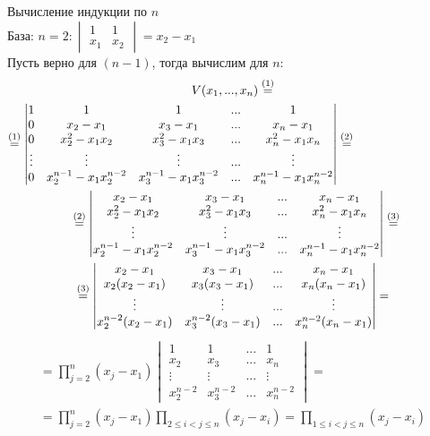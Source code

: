 \documentclass[a4paper, 12pt]{article}
\newcommand\tab[1][.5cm]{\hspace*{#1}}
\theoremstyle{definition}
\begin{document}
  Вычисление индукции по $n$ \\ 
  База: $n=2: \begin{vmatrix}
    1 & 1\\ x_1 & x_2 \end{vmatrix} = x_2 - x_1$ \\
  Пусть верно для $(n-1)$, тогда вычислим для $n$: 
  \begin{multline*}
    V(x_1,...,x_n) \overset{(1)}{=} \\ 
    \overset{(1)}{=} \begin{vmatrix}
      1 & 1 & 1 & ... & 1 \\
      0 & x_2-x_1 & x_3-x_1 & ... & x_n - x_1 \\
      0 & x_2^2 -x_1x_2 & x_3^2-x_1x_3 & ... & x_n^2-x_1x_n \\
      \vdots & \vdots & \vdots & ... & \vdots \\
      0 & x_2^{n-1}-x_1x_2^{n-2} & x_3^{n-1}-x_1x_3^{n-2} & ... & x_n^{n-1}-x_1x_n^{n-2}
    \end{vmatrix} \overset{(2)}{=} \tab[3cm]\\ 
    \overset{(2)}{=} \begin{vmatrix}
      x_2-x_1 & x_3-x_1 & ... & x_n - x_1 \\
      x_2^2 -x_1x_2 & x_3^2-x_1x_3 & ... & x_n^2-x_1x_n \\
      \vdots & \vdots & ... & \vdots \\
      x_2^{n-1}-x_1x_2^{n-2} & x_3^{n-1}-x_1x_3^{n-2} & ... & x_n^{n-1}-x_1x_n^{n-2}
    \end{vmatrix} \overset{(3)}{=} \tab[-0.2cm]\\
    \overset{(3)}{=} \begin{vmatrix}
    x_2-x_1 & x_3-x_1 & ... & x_n - x_1 \\
    x_2(x_2-x_1) & x_3(x_3-x_1) & ... & x_n(x_n-x_1) \\
    \vdots & \vdots & ... & \vdots \\
    x_2^{n-2}(x_2-x_1) & x_3^{n-2}(x_3-x_1) & ... & x_n^{n-2}(x_n-x_1)
    \end{vmatrix} =
  \end{multline*}
  \begin{multline*}
    = \prod\limits_{j=2}^{n}(x_j - x_1) \begin{vmatrix}
      1 & 1 & ... & 1\\
      x_2 & x_3 & ... & x_n\\
      \vdots & \vdots & ... & \vdots \\
      x_2^{n-2} & x_3^{n-2} & ... & x_n^{n-2}
      \end{vmatrix} = \\
      = \prod\limits_{j=2}^{n}(x_j - x_1)\prod\limits_{2\leq i < j \leq n} (x_j - x_i) = \prod\limits_{1\leq i < j \leq n} (x_j - x_i)
  \end{multline*}
\end{document}
